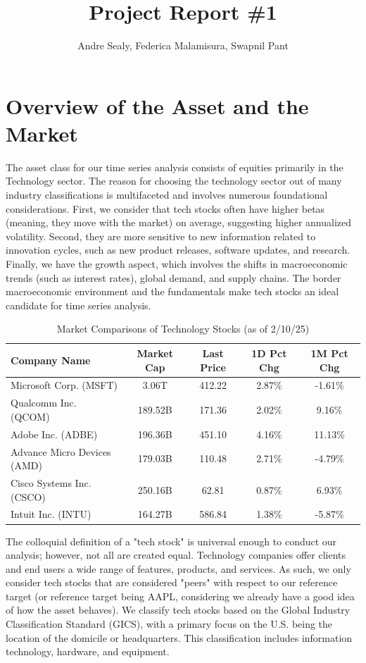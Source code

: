 \documentclass[12pt]{article}
\title{Project Report \#1}
\author{Andre Sealy, Federica Malamisura, Swapnil Pant}
\begin{document}
	
\maketitle

\section{Overview of the Asset and the Market}

The asset class for our time series analysis consists of equities primarily in the Technology sector. The reason for choosing the technology sector out of many industry classifications is multifaceted and involves numerous foundational considerations. First, we consider that tech stocks often have higher betas (meaning, they move with the market) on average, suggesting higher annualized volatility. Second, they are more sensitive to new information related to innovation cycles, such as new product releases, software updates, and research. Finally, we have the growth aspect, which involves the shifts in macroeconomic trends (such as interest rates), global demand, and supply chains. The border macroeconomic environment and the fundamentals make tech stocks an ideal candidate for time series analysis.

\begin{table}[ht]
	\centering
	\caption{Market Comparisons of Technology Stocks (as of 2/10/25)}
	\begin{tabular}[t]{lcccc}
		\toprule
		Company Name & Market Cap & Last Price & 1D Pct Chg& 1M Pct Chg \\
		\midrule
		Microsoft Corp. (MSFT) & 3.06T &412.22&2.87\%&-1.61\%  \\
		Qualcomm Inc. (QCOM) & 189.52B &171.36&2.02\%&9.16\%  \\
		Adobe Inc. (ADBE) & 196.36B	&451.10&4.16\%&11.13\% \\	   
		Advance Micro Devices (AMD) & 179.03B&110.48&2.71\%&-4.79\% \\
		Cisco Systems Inc. (CSCO) & 250.16B & 62.81 & 0.87\% & 6.93\%\\
		Intuit Inc. (INTU) & 164.27B & 586.84 & 1.38\% & -5.87\% \\ 				   
		\bottomrule
	\end{tabular}\label{tab:market_of_tech}
\end{table}

The colloquial definition of a "tech stock" is universal enough to conduct our analysis; however, not all are created equal. Technology companies offer clients and end users a wide range of features, products, and services. As such, we only consider tech stocks that are considered "peers" with respect to our reference target (or reference target being AAPL, considering we already have a good idea of how the asset behaves). We classify tech stocks based on the Global Industry Classification Standard (GICS), with a primary focus on the U.S. being the location of the domicile or headquarters. This classification includes information technology, hardware, and equipment.
\end{document}
